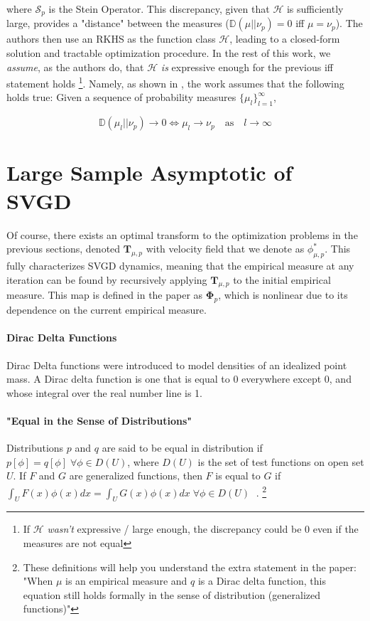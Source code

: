 \documentclass[12pt]{article}
\begin{document}
\noindent where $\mathcal{S}_p$ is the Stein Operator. This discrepancy, given that $\mathcal{H}$ is sufficiently large, provides a "distance" between the measures ($\mathbb{D}(\mu || \nu_p) = 0$ iff $\mu = \nu_p$). The authors then use an RKHS as the function class $\mathcal{H}$, leading to a closed-form solution and tractable optimization procedure. In the rest of this work, we \textit{assume}, as the authors do, that $\mathcal{H}$ \textit{is} expressive enough for the previous iff statement holds \footnote{If $\mathcal{H}$ \textit{wasn't} expressive / large enough, the discrepancy could be 0 even if the measures are not equal}. Namely, as shown in \cite{gorham2017measuring}, the work assumes that the following holds true: Given a sequence of probability measures $\{ \mu_l \}_{l=1}^\infty$,

\begin{equation}
    \mathbb{D}(\mu_l || \nu_p) \rightarrow 0 \iff \mu_l \rightarrow \nu_p \quad \text{as} \quad  l \rightarrow \infty
\end{equation}

\section{Large Sample Asymptotic of SVGD}

Of course, there exists an optimal transform to the optimization problems in the previous sections, denoted $\mathbf{T}_{\mu, p}$ with velocity field that we denote as $\phi^*_{\mu, p}$. This fully characterizes SVGD dynamics, meaning that the empirical measure at any iteration can be found by recursively applying $\mathbf{T}_{\mu, p}$ to the initial empirical measure. This map is defined in the paper as $\mathbf{\Phi}_p$, which is nonlinear due to its dependence on the current empirical measure. 

\paragraph{Dirac Delta Functions} Dirac Delta functions were introduced to model densities of an idealized point mass. A Dirac delta function is one that is equal to 0 everywhere except 0, and whose integral over the real number line is 1.

\paragraph{"Equal in the Sense of Distributions"} Distributions $p$ and $q$ are said to be equal in distribution if $p[\phi] = q[\phi] \; \forall \phi \in D(U)$, where $D(U)$ is the set of test functions on open set $U$. If $F$ and $G$ are generalized functions, then $F$ is equal to $G$ if $\int_UF(x)\phi(x)dx = \int_UG(x)\phi(x)dx \;  \forall \phi \in D(U) \;$ \cite{theoryofdistributions}. \footnote{These definitions will help you understand the extra statement in the paper: "When $\mu$ is an empirical measure and $q$ is a Dirac delta function, this equation still holds formally in the sense of distribution (generalized functions)"}\\
\end{document}
